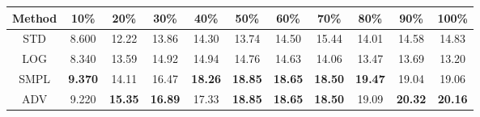 \documentclass{standalone}
\begin{document}
\begin{tabular}{c|cccccccccc}
      \toprule
      Method & 10\% & 20\% & 30\% & 40\% & 50\% & 60\% & 70\% & 80\% & 90\% & 100\% \\
      \midrule
STD & 8.600 & 12.22 & 13.86 & 14.30 & 13.74 & 14.50 & 15.44 & 14.01 & 14.58 & 14.83\\
LOG & 8.340 & 13.59 & 14.92 & 14.94 & 14.76 & 14.63 & 14.06 & 13.47 & 13.69 & 13.20\\
SMPL & \textbf{9.370} & 14.11 & 16.47 & \textbf{18.26} & \textbf{18.85} & \textbf{18.65} & \textbf{18.50} & \textbf{19.47} & 19.04 & 19.06\\
ADV & 9.220 & \textbf{15.35} & \textbf{16.89} & 17.33 & \textbf{18.85} & \textbf{18.65} & \textbf{18.50} & 19.09 & \textbf{20.32} & \textbf{20.16}\\
  \bottomrule
\end{tabular}
\end{document}
